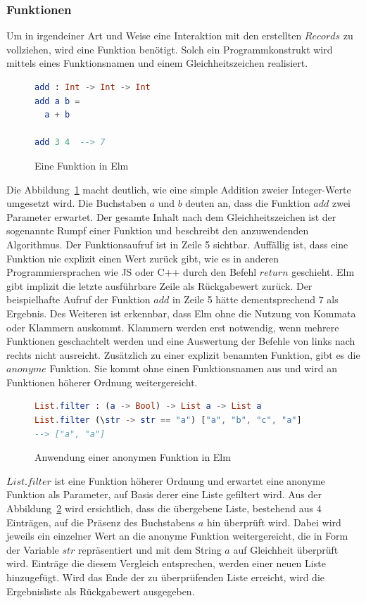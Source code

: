 \subsubsection{Funktionen}
\label{sec:Funktionen}
Um in irgendeiner Art und Weise eine Interaktion mit den erstellten $Records$ zu vollziehen, wird eine Funktion benötigt. Solch ein Programmkonstrukt wird mittels eines Funktionsnamen und einem Gleichheitszeichen realisiert.
\begin{figure}[h]
\begin{lstlisting}[language=Elm]
add : Int -> Int -> Int
add a b =
  a + b

add 3 4  --> 7
\end{lstlisting}
\caption{Eine Funktion in Elm}\label{fig:elm-function}
\end{figure}
Die Abbildung~\ref{fig:elm-function} macht deutlich, wie eine simple Addition zweier Integer-Werte umgesetzt wird. Die Buchstaben $a$ und $b$ deuten an, dass die Funktion $add$ zwei Parameter erwartet. Der gesamte Inhalt nach dem Gleichheitszeichen ist der sogenannte Rumpf einer Funktion und beschreibt den anzuwendenden Algorithmus. Der Funktionsaufruf ist in Zeile 5 sichtbar. Auffällig ist, dass eine Funktion nie explizit einen Wert zurück gibt, wie es in anderen Programmiersprachen wie \ac{JS} oder C++ durch den Befehl $return$ geschieht. Elm gibt implizit die letzte ausführbare Zeile als Rückgabewert zurück. Der beispielhafte Aufruf der Funktion $add$ in Zeile 5 hätte dementsprechend $7$ als Ergebnis. Des Weiteren ist erkennbar, dass Elm ohne die Nutzung von Kommata oder Klammern auskommt. Klammern werden erst notwendig, wenn mehrere Funktionen geschachtelt werden und eine Auswertung der Befehle von links nach rechts nicht ausreicht.
Zusätzlich zu einer explizit benannten Funktion, gibt es die $anonyme$ Funktion. Sie kommt ohne einen Funktionsnamen aus und wird an Funktionen höherer Ordnung weitergereicht.
\begin{figure}[h]
\begin{lstlisting}[language=Elm]
List.filter : (a -> Bool) -> List a -> List a
List.filter (\str -> str == "a") ["a", "b", "c", "a"]
--> ["a", "a"]
\end{lstlisting}
\caption{Anwendung einer anonymen Funktion in Elm}\label{fig:elm-anonym-function}
\end{figure}
$List.filter$ ist eine Funktion höherer Ordnung und erwartet eine anonyme Funktion als Parameter, auf Basis derer eine Liste gefiltert wird. Aus der Abbildung~\ref{fig:elm-anonym-function} wird ersichtlich, dass die übergebene Liste, bestehend aus $4$ Einträgen, auf die Präsenz des Buchstabens $a$ hin überprüft wird. Dabei wird jeweils ein einzelner Wert an die anonyme Funktion weitergereicht, die in Form der Variable $str$ repräsentiert und mit dem String $a$ auf Gleichheit überprüft wird. Einträge die diesem Vergleich entsprechen, werden einer neuen Liste hinzugefügt. Wird das Ende der zu überprüfenden Liste erreicht, wird die Ergebnisliste als Rückgabewert ausgegeben.


